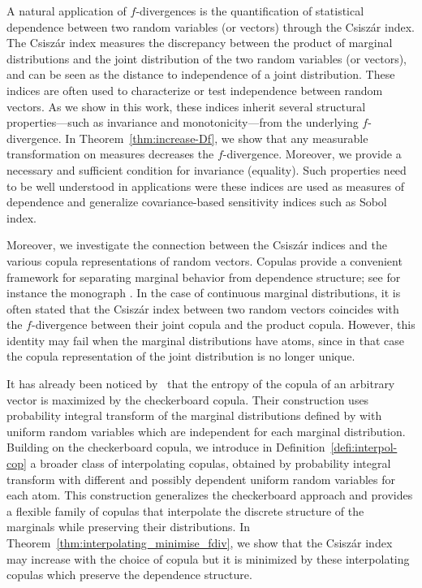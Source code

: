 \documentclass[12pt]{article}
\theoremstyle{plain}
\theoremstyle{remark}
\begin{document}
A natural application of $f$-divergences is the quantification of statistical dependence between two random variables (or vectors) through the Csisz\'ar index. The Csisz\'ar index measures the discrepancy between the product of marginal distributions and the joint distribution of the two random variables (or vectors), and can be seen as the distance to independence of a joint distribution. These indices are often used to characterize or test independence between random vectors. As we show in this work, these indices inherit several structural properties—such as invariance and monotonicity—from the underlying $f$-divergence. In Theorem~\ref{thm:increase-Df}, we show that any measurable transformation on measures decreases the $f$-divergence. Moreover, we provide a necessary and sufficient condition for invariance (equality). %
Such properties need to be well understood in applications were these indices are used as measures of dependence and generalize covariance-based sensitivity indices such as Sobol index.

Moreover, we investigate the connection between  the Csisz\'ar indices and the various copula representations of random vectors. Copulas provide a convenient framework for separating marginal behavior from dependence structure; see for instance the monograph \cite{nelsen2006introduction}. In the case of continuous marginal distributions, it is often stated that the Csisz\'ar index between two random vectors coincides with the $f$-divergence between their joint copula and the product copula. However, this identity may fail when the marginal distributions have atoms, since in that case the copula representation of the joint distribution is no longer unique.

It has already been noticed by~\citet[Theorem~2]{lin2025checkerboard}  that the entropy of the copula of an arbitrary vector is maximized by the checkerboard copula. Their construction uses probability integral transform of the marginal distributions defined by \cite{ruschendorf2013mathematical}  with uniform random variables which are independent for each marginal distribution. 
Building on the checkerboard copula, we introduce in Definition~\ref{defi:interpol-cop} a broader class of interpolating copulas, obtained by probability integral transform with different and possibly dependent uniform random variables for each atom. This construction generalizes the checkerboard approach and provides a flexible family of copulas that interpolate the discrete structure of the marginals while preserving their distributions. %
In Theorem~\ref{thm:interpolating_minimise_fdiv}, we show that the Csiszár index may increase with the choice of copula but it is minimized by these interpolating copulas which preserve the dependence structure. 
\end{document}
